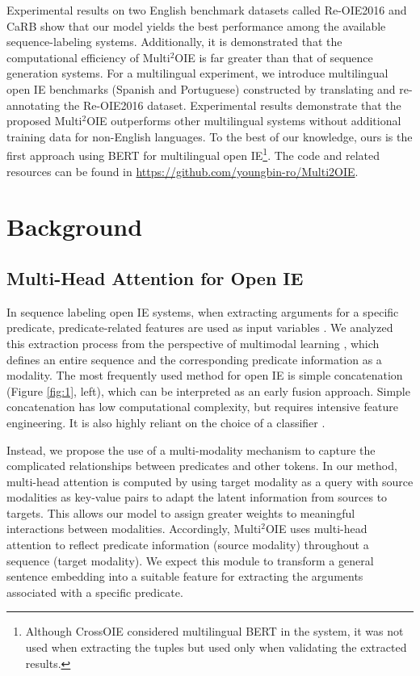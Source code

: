 \documentclass[11pt,a4paper]{article}
\begin{document}
Experimental results on two English benchmark datasets called Re-OIE2016 \citep{Zhan2019SpanMF} and CaRB \citep{bhardwaj-etal-2019-carb} show that our model yields the best performance among the available sequence-labeling systems.
Additionally, it is demonstrated that the computational efficiency of Multi$^2$OIE is far greater than that of sequence generation systems.
For a multilingual experiment, we introduce multilingual open IE benchmarks (Spanish and Portuguese) constructed by translating and re-annotating the Re-OIE2016 dataset.
Experimental results demonstrate that the proposed Multi$^2$OIE outperforms other multilingual systems without additional training data for non-English languages.
To the best of our knowledge, ours is the first approach using BERT for multilingual open IE\footnote{Although CrossOIE \citep{Cabral2020CrossOIE} considered multilingual BERT in the system, it was not used when extracting the tuples but used only when validating the extracted results.}.
The code and related resources can be found in \url{https://github.com/youngbin-ro/Multi2OIE}.

\section{Background}
\subsection{Multi-Head Attention for Open IE}
In sequence labeling open IE systems, when extracting arguments for a specific predicate, predicate-related features are used as input variables \citep{stanovsky-etal-2018-supervised,Zhan2019SpanMF,jia2019hybrid}.
We analyzed this extraction process from the perspective of multimodal learning \citep{Mangai2010ASO,10.5555/3104482.3104569,10.1109/TPAMI.2018.2798607}, which defines an entire sequence and the corresponding predicate information as a modality.
The most frequently used method for open IE is simple concatenation (Figure \ref{fig:1}, left), which can be interpreted as an early fusion approach.
Simple concatenation has low computational complexity, but requires intensive feature engineering.
It is also highly reliant on the choice of a classifier \citep{doi:10.1142/S1793351X16400158,Liu2018LearnTC}.

Instead, we propose the use of a multi-modality mechanism \citep{tsai-etal-2019-multimodal} to capture the complicated relationships between predicates and other tokens. In our method, multi-head attention is computed by using target modality as a query with source modalities as key-value pairs to adapt the latent information from sources to targets.
This allows our model to assign greater weights to meaningful interactions between modalities.
Accordingly, Multi$^2$OIE uses multi-head attention to reflect predicate information (source modality) throughout a sequence (target modality).
We expect this module to transform a general sentence embedding into a suitable feature for extracting the arguments associated with a specific predicate.
\end{document}
